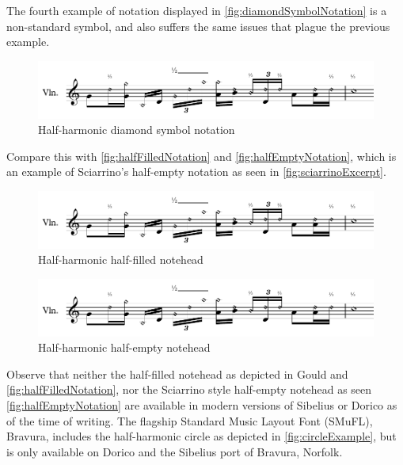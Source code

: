 The fourth example of notation displayed in \autoref{fig:diamondSymbolNotation} is a non-standard symbol, and also suffers the same issues that plague the previous example.

\begin{figure}
  \includegraphics[page=4,width=\textwidth]{resources/halfHarmonicsSingleExamples.pdf}
  \caption{Half-harmonic diamond symbol notation}\label{fig:diamondSymbolNotation}
\end{figure}


Compare this with \autoref{fig:halfFilledNotation} and \autoref{fig:halfEmptyNotation}, which is an example of Sciarrino's half-empty notation as seen in \autoref{fig:sciarrinoExcerpt}.

\begin{figure}
  \includegraphics[page=5,width=\textwidth]{resources/halfHarmonicsSingleExamples.pdf}
  \caption{Half-harmonic half-filled notehead}\label{fig:halfFilledNotation}
\end{figure}


\begin{figure}
  \includegraphics[page=2,width=\textwidth]{resources/halfHarmonicsSingleExamples.pdf}
  \caption{Half-harmonic half-empty notehead}\label{fig:halfEmptyNotation}
\end{figure}



Observe that neither the half-filled notehead as depicted in Gould and \autoref{fig:halfFilledNotation}, nor the Sciarrino style half-empty notehead as seen \autoref{fig:halfEmptyNotation} are available in modern versions of Sibelius or Dorico as of the time of writing.\autocite[424]{gouldBars2011}
The flagship Standard Music Layout Font (SMuFL), Bravura, includes the half-harmonic circle as depicted in \autoref{fig:circleExample}, but is only available on Dorico and the Sibelius port of Bravura, Norfolk.\autocite[]{w3ccommitteeStandardMusicFont2019}


